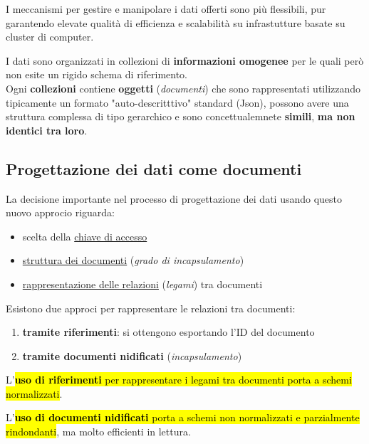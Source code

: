 \documentclass[12pt, a4paper, oneside]{book}
\begin{document}
    I meccanismi per gestire e manipolare i dati offerti sono più flessibili, pur garantendo elevate qualità di efficienza e scalabilità su infrastutture basate su cluster di computer.

    I dati sono organizzati in collezioni di \textcolor{azzurrino}{\textbf{informazioni omogenee}} per le quali però non esite un rigido schema di riferimento.\\[0.2ex]
    Ogni \textcolor{azzurrino}{\textbf{collezioni}} contiene \textcolor{azzurrino}{\textbf{oggetti}} (\textcolor{azzurrino}{\textit{documenti}}) che sono rappresentati utilizzando tipicamente un formato "auto-descritttivo" standard (Json), possono avere una struttura complessa di tipo gerarchico e sono concettualemnete \textcolor{azzurrino}{\textbf{simili}}, \textcolor{azzurrino}{\textbf{ma non identici tra loro}}.

    \subsection{Progettazione dei dati come documenti}

    La decisione importante nel processo di progettazione dei dati usando questo nuovo approcio riguarda:
    \begin{itemize}
      \item scelta della \underline{chiave di accesso}
      \item \underline{struttura dei documenti} (\textit{grado di incapsulamento})
      \item \underline{rappresentazione delle relazioni} (\textit{legami}) tra documenti
    \end{itemize}

    Esistono due approci per rappresentare le relazioni tra documenti:
    \begin{enumerate}
      \item \textbf{\textcolor{azzurrino}{tramite riferimenti}}: si ottengono esportando l'ID del documento
      \item \textbf{\textcolor{azzurrino}{tramite documenti nidificati}} (\textit{incapsulamento})
    \end{enumerate}

    L'\hl{\textbf{uso di riferimenti} per rappresentare i legami tra documenti porta a schemi normalizzati}.

    L'\hl{\textbf{uso di documenti nidificati} porta a schemi non normalizzati e parzialmente rindondanti}, ma molto efficienti in lettura.
\end{document}
